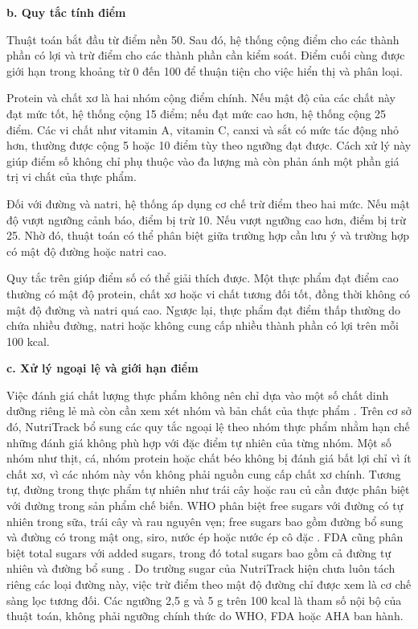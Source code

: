 \documentclass[12pt, a4paper]{report}
\begin{document}
\textbf{b. Quy tắc tính điểm}

Thuật toán bắt đầu từ điểm nền 50. Sau đó, hệ thống cộng điểm cho các thành phần có lợi và trừ điểm cho các thành phần cần kiểm soát. Điểm cuối cùng được giới hạn trong khoảng từ 0 đến 100 để thuận tiện cho việc hiển thị và phân loại.

Protein và chất xơ là hai nhóm cộng điểm chính. Nếu mật độ của các chất này đạt mức tốt, hệ thống cộng 15 điểm; nếu đạt mức cao hơn, hệ thống cộng 25 điểm. Các vi chất như vitamin A, vitamin C, canxi và sắt có mức tác động nhỏ hơn, thường được cộng 5 hoặc 10 điểm tùy theo ngưỡng đạt được. Cách xử lý này giúp điểm số không chỉ phụ thuộc vào đa lượng mà còn phản ánh một phần giá trị vi chất của thực phẩm.

Đối với đường và natri, hệ thống áp dụng cơ chế trừ điểm theo hai mức. Nếu mật độ vượt ngưỡng cảnh báo, điểm bị trừ 10. Nếu vượt ngưỡng cao hơn, điểm bị trừ 25. Nhờ đó, thuật toán có thể phân biệt giữa trường hợp cần lưu ý và trường hợp có mật độ đường hoặc natri cao.

Quy tắc trên giúp điểm số có thể giải thích được. Một thực phẩm đạt điểm cao thường có mật độ protein, chất xơ hoặc vi chất tương đối tốt, đồng thời không có mật độ đường và natri quá cao. Ngược lại, thực phẩm đạt điểm thấp thường do chứa nhiều đường, natri hoặc không cung cấp nhiều thành phần có lợi trên mỗi 100 kcal.

\textbf{c. Xử lý ngoại lệ và giới hạn điểm}

Việc đánh giá chất lượng thực phẩm không nên chỉ dựa vào một số chất dinh dưỡng riêng lẻ mà còn cần xem xét nhóm và bản chất của thực phẩm \cite{drewnowski2019}. Trên cơ sở đó, NutriTrack bổ sung các quy tắc ngoại lệ theo nhóm thực phẩm nhằm hạn chế những đánh giá không phù hợp với đặc điểm tự nhiên của từng nhóm. Một số nhóm như thịt, cá, nhóm protein hoặc chất béo không bị đánh giá bất lợi chỉ vì ít chất xơ, vì các nhóm này vốn không phải nguồn cung cấp chất xơ chính. Tương tự, đường trong thực phẩm tự nhiên như trái cây hoặc rau củ cần được phân biệt với đường trong sản phẩm chế biến. WHO phân biệt free sugars với đường có tự nhiên trong sữa, trái cây và rau nguyên vẹn; free sugars bao gồm đường bổ sung và đường có trong mật ong, siro, nước ép hoặc nước ép cô đặc \cite{who2015}. FDA cũng phân biệt total sugars với added sugars, trong đó total sugars bao gồm cả đường tự nhiên và đường bổ sung \cite{fda_addedsugars}. Do trường sugar của NutriTrack hiện chưa luôn tách riêng các loại đường này, việc trừ điểm theo mật độ đường chỉ được xem là cơ chế sàng lọc tương đối. Các ngưỡng 2,5 g và 5 g trên 100 kcal là tham số nội bộ của thuật toán, không phải ngưỡng chính thức do WHO, FDA hoặc AHA ban hành.
\end{document}
